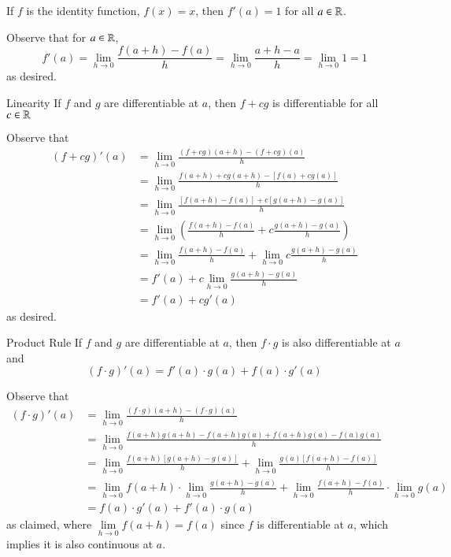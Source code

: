\documentclass[12pt]{report}
\begin{document}
\begin{thm}{}{}
    If $f$ is the identity function, $f(x) = x$, then $f'(a) = 1$ for all $a \in \mathbb R$.
\end{thm}
\begin{proof*}{}{}
    Observe that for $a \in \mathbb R$, $$f'(a) = \lim\limits_{h\rightarrow 0}\frac{f(a+h)-f(a)}{h} = \lim\limits_{h\rightarrow 0}\frac{a+h-a}{h} = \lim\limits_{h\rightarrow 0} 1 = 1$$
    as desired.
\end{proof*}

\begin{thm}{Linearity}{}
    If $f$ and $g$ are differentiable at $a$, then $f+cg$ is differentiable for all $c \in \mathbb R$
\end{thm}
\begin{proof*}{}{}
    Observe that \begin{align*}
        (f+cg)'(a) &= \lim\limits_{h\rightarrow 0}\frac{(f+cg)(a+h) - (f+cg)(a)}{h} \\
        &= \lim\limits_{h\rightarrow 0}\frac{f(a+h)+cg(a+h)-[f(a)+cg(a)]}{h} \\
        &= \lim\limits_{h\rightarrow 0}\frac{[f(a+h)-f(a)]+c[g(a+h)-g(a)]}{h} \\
        &= \lim\limits_{h\rightarrow 0}\left(\frac{f(a+h)-f(a)}{h}+c\frac{g(a+h)-g(a)}{h}\right) \\
        &= \lim\limits_{h\rightarrow 0}\frac{f(a+h)-f(a)}{h}+\lim\limits_{h\rightarrow 0}c\frac{g(a+h)-g(a)}{h} \\
        &= f'(a) + c\lim\limits_{h\rightarrow 0}\frac{g(a+h)-g(a)}{h} \\
        &= f'(a)+cg'(a) 
    \end{align*}
    as desired.
\end{proof*}

\begin{thm}{Product Rule}{}
    If $f$ and $g$ are differentiable at $a$, then $f\cdot g$ is also differentiable at $a$ and $$(f\cdot g)'(a) = f'(a)\cdot g(a) + f(a) \cdot g'(a)$$
\end{thm}
\begin{proof*}{}{}
    Observe that \begin{align*}
        (f\cdot g)'(a) &= \lim\limits_{h\rightarrow 0}\frac{(f\cdot g)(a+h) - (f\cdot g)(a)}{h} \\
        &= \lim\limits_{h\rightarrow 0}\frac{f(a+h)g(a+h) - f(a+h)g(a) + f(a+h)g(a) - f(a)g(a)}{h} \\
        &= \lim\limits_{h\rightarrow 0}\frac{f(a+h)[g(a+h)-g(a)]}{h} + \lim\limits_{h\rightarrow 0}\frac{g(a)[f(a+h) - f(a)]}{h} \\
        &= \lim\limits_{h\rightarrow 0}f(a+h)\cdot \lim\limits_{h\rightarrow 0}\frac{g(a+h) - g(a)}{h} + \lim\limits_{h\rightarrow 0}\frac{f(a+h)-f(a)}{h}\cdot \lim\limits_{h\rightarrow 0}g(a) \\
        &= f(a)\cdot g'(a) + f'(a)\cdot g(a)
    \end{align*}
    as claimed, where $\lim\limits_{h\rightarrow 0}f(a+h) = f(a)$ since $f$ is differentiable at $a$, which implies it is also continuous at $a$.
\end{proof*}
\end{document}
